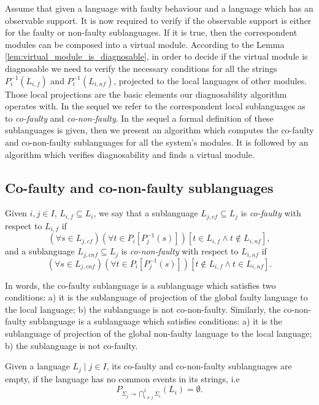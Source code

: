 \documentclass[a4paper, 10pt, conference]{ieeeconf}
\begin{document}
Assume that given a language with faulty behaviour and a language which has an
observable support. It is now required to verify if the observable support is
either for the faulty or non-faulty sublanguages. If it is true, then the
correspondent modules can be composed into a virtual module.
According to the Lemma \ref{lem:virtual_module_is_diagnosable}, in order to
decide if the virtual module is diagnosable we need to verify the necessary
conditions for all the strings $P_i^{-1}(L_{i,f})$ and $P_i^{-1}(L_{i,nf})$,
projected to the local languages of other modules. Those local projections are
the basic elements our diagnosability algorithm operates with. In the sequel we
refer to the correspondent local sublanguages as to \emph{co-faulty} and
\emph{co-non-faulty}. In the sequel a formal definition of these sublanguages is
given, then we present an algorithm which computes the co-faulty and
co-non-faulty sublanguages for all the system's modules. It is followed by an
algorithm which verifies diagnosability and finds a virtual module.

\subsection{Co-faulty and co-non-faulty sublanguages}

\begin{definition}
\label{def:co-faulty}
Given $i, j \in I$, $L_{i,f} \subseteq L_i$,
we say that a sublanguage $L_{j,cf} \subseteq L_j$ is \emph{co-faulty} with
respect to $L_{i,f}$ if 
$$
	(\forall s \in L_{j,cf})(\forall t \in P_i[P_j^{-1}(s)])
	\left[
		t \in L_{i,f} \land t \not \in L_{i,nf}   
	\right],
$$ 
and a sublanguage $L_{j,cnf} \subseteq L_j$ is
\emph{co-non-faulty} with respect to $L_{i,nf}$ if 
$$
	(\forall s \in L_{j,cnf})(\forall t \in P_i[P_j^{-1}(s)])
	\left[
		t \not \in L_{i,f} \land t \in L_{i,nf}   
	\right].
$$ 
\end{definition}

In words, the co-faulty sublanguage is a sublanguage which satisfies two
conditions:
a) it is the sublanguage of projection of the global faulty language
to the local language; b) the sublanguage is not co-non-faulty.
Similarly, the co-non-faulty sublanguage is a sublanguage which satisfies
conditions:
a) it is the sublanguage of projection of the global non-faulty language
to the local language; b) the sublanguage is not co-faulty.

\begin{lemma}
\label{lem:empty_co_if_no_common}  
Given a language $L_j\mid j \in I$, its co-faulty and
co-non-faulty sublanguages are empty, if the language has no common events in
its strings, i.e
$$P_{\Sigma_j \rightarrow \bigcap_{i\neq j}^I \Sigma_i}(L_i) = \emptyset.$$
\end{lemma}
\end{document}

